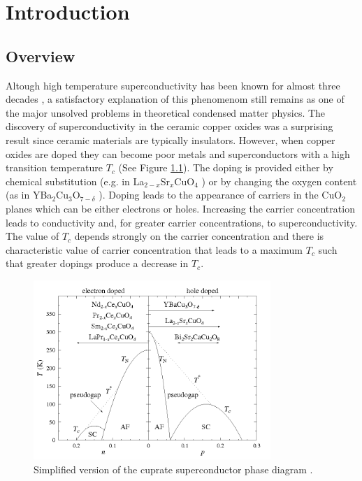 \chapter{Introduction}
\label{chap:introduction}

\section{Overview}
\label{sec:overview}

Altough high temperature superconductivity has been known for almost three decades \cite{Bednorz1986}, a satisfactory explanation of this phenomenom still remains as one of the major unsolved problems in theoretical condensed matter physics. 
The discovery of superconductivity in the ceramic copper oxides was a surprising result since ceramic materials are typically insulators.
However, when copper oxides are doped they can become poor metals and superconductors with a high transition temperature $T_c$ (See Figure \ref{fig:CuPhaseDiag}). 
The doping is provided either by chemical substitution (e.g. in La$_{2-x}$Sr$_x$CuO$_4$ \cite{Cava1987}) or by changing the oxygen content (as in YBa$_2$Cu$_3$O$_{7-\delta}$ \cite{Wu1987}). 
Doping leads to the appearance of carriers in the CuO$_2$ planes which can be either electrons or holes.
Increasing the carrier concentration leads to conductivity and, for greater carrier concentrations, to superconductivity. 
The value of $T_c$ depends strongly on the carrier concentration and there is characteristic value of carrier concentration that leads to a maximum $T_c$ such that greater dopings produce a decrease in $T_c$.

\begin{figure}[ht]
  \centering
  \includegraphics[width=0.8\textwidth]{images/CuPhaseDiag.png}
  \caption[Simplified version of the cuprate superconductor phase diagram]
  {Simplified version of the cuprate superconductor phase diagram \protect\cite{CuPhaseDiag}.}
  \label{fig:CuPhaseDiag}
\end{figure}

